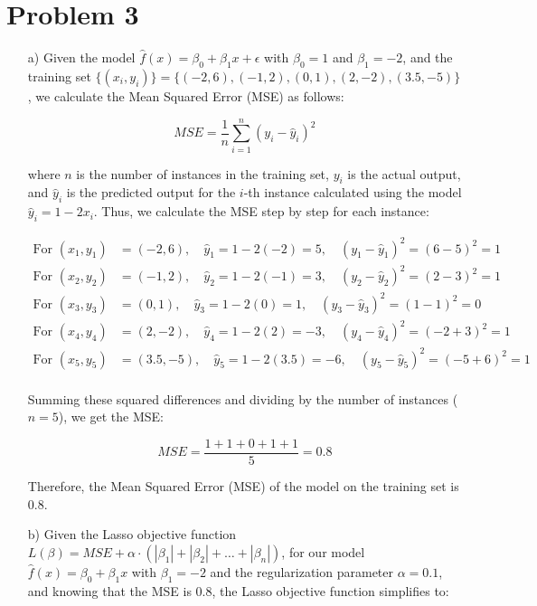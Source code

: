 \documentclass{article}
\begin{document}
    \section*{Problem 3}
\begin{itemize}
    \item [a)]
        Given the model $\hat{f}(x) = \beta_0 + \beta_1x + \epsilon$ with $\beta_0 = 1$ and $\beta_1 = -2$, and the training set $\{(x_i, y_i)\} = \{(-2, 6), (-1, 2), (0, 1), (2, -2), (3.5, -5)\}$, we calculate the Mean Squared Error (MSE) as follows:

        \[
        MSE = \frac{1}{n} \sum_{i=1}^{n} (y_i - \hat{y}_i)^2
        \]
        
        where $n$ is the number of instances in the training set, $y_i$ is the actual output, and $\hat{y}_i$ is the predicted output for the $i$-th instance calculated using the model $\hat{y}_i = 1 - 2x_i$. Thus, we calculate the MSE step by step for each instance:
        
        \begin{align*}
        \text{For } (x_1, y_1) &= (-2, 6), \quad \hat{y}_1 = 1 - 2(-2) = 5, \quad (y_1 - \hat{y}_1)^2 = (6 - 5)^2 = 1 \\
        \text{For } (x_2, y_2) &= (-1, 2), \quad \hat{y}_2 = 1 - 2(-1) = 3, \quad (y_2 - \hat{y}_2)^2 = (2 - 3)^2 = 1 \\
        \text{For } (x_3, y_3) &= (0, 1), \quad \hat{y}_3 = 1 - 2(0) = 1, \quad (y_3 - \hat{y}_3)^2 = (1 - 1)^2 = 0 \\
        \text{For } (x_4, y_4) &= (2, -2), \quad \hat{y}_4 = 1 - 2(2) = -3, \quad (y_4 - \hat{y}_4)^2 = (-2 + 3)^2 = 1 \\
        \text{For } (x_5, y_5) &= (3.5, -5), \quad \hat{y}_5 = 1 - 2(3.5) = -6, \quad (y_5 - \hat{y}_5)^2 = (-5 + 6)^2 = 1 \\
        \end{align*}
        
        Summing these squared differences and dividing by the number of instances ($n=5$), we get the MSE:
        
        \[
        MSE = \frac{1 + 1 + 0 + 1 + 1}{5} = 0.8
        \]
        
        Therefore, the Mean Squared Error (MSE) of the model on the training set is $0.8$.

    \item[b)]
        Given the Lasso objective function $L(\beta) = MSE + \alpha \cdot (\left|\beta_1\right| + \left|\beta_2\right| + \ldots + \left|\beta_n\right|)$, for our model $\hat{f}(x) = \beta_0 + \beta_1x$ with $\beta_1 = -2$ and the regularization parameter $\alpha = 0.1$, and knowing that the MSE is $0.8$, the Lasso objective function simplifies to:


\end{itemize}
\end{document}
